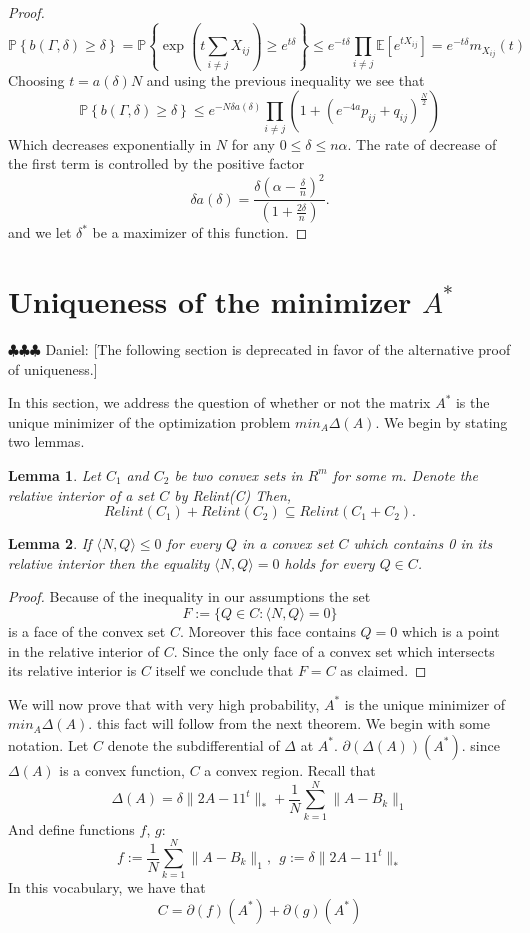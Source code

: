 \documentclass[12pt]{amsart}
\newtheorem{lemma}{Lemma}[section]
\theoremstyle{remark}
\newcommand{\PP}{\mathbb{P}}
\newcommand{\EE}{\mathbb{E}}
\newcommand{\ddr}[1]{{\color{blue} \sf $\clubsuit\clubsuit\clubsuit$ Daniel: [#1]}}
\begin{document}
\begin{proof}
\[\PP\left\{b(\Gamma,\delta)\geq \delta\right\}=\PP\left\{\exp\left(t\sum_{i\neq j} X_{ij}\right)\geq e^{t\delta}\right\}\leq e^{-t\delta}\prod_{i\neq j} \EE[e^{tX_{ij}}]= e^{-t\delta}m_{X_{ij}}(t)\]
Choosing $t=a(\delta)N$ and using the previous inequality we see that
\[\PP\left\{b(\Gamma,\delta)\geq \delta\right\}\leq e^{-N\delta a(\delta)}\prod_{i\neq j}\left(1+ (e^{-4a}p_{ij}+q_{ij})^{\frac{N}{2}}\right)\]
Which decreases exponentially in $N$ for any $0\leq \delta\leq n\alpha$. The rate of decrease of the first term is controlled by the positive factor 
\[\delta a(\delta)= \frac{\delta\left(\alpha-\frac{\delta}{n}\right)^2}{\left(1+\frac{2\delta}{n}\right)}.\]
and we let $\delta^*$ be a maximizer of this function.
\end{proof}


\section{Uniqueness of the minimizer $A^*$}
\ddr{The following section is deprecated in favor of the alternative proof of uniqueness.}

In this section, we address the question of whether or not the matrix $A^*$ is the unique minimizer of the optimization problem $min_A\Delta(A)$. We begin by stating two lemmas.

\begin{lemma}
Let $C_1$ and $C_2$ be two convex sets in $R^m$ for some m. Denote the relative interior of a set $C$ by Relint(C) Then,
\[
Relint(C_1)+Relint(C_2) \subseteq Relint(C_1+C_2).
\]
\end{lemma}


\begin{lemma}{\label{lema2}} If $\langle N,Q\rangle\leq 0$ for every $Q$ in a convex set $C$ which contains 0 in its relative interior then the equality  $\langle N,Q\rangle=0$ holds for every $Q\in C$.
\end{lemma}
\begin{proof} Because of the inequality in our assumptions the set
\[F:=\{ Q\in C: \langle N,Q\rangle=0\}\]
is a face of the convex set $C$. 
Moreover this face contains $Q=0$ which is a point in the relative interior of $C$. Since the only face of a convex set which intersects its relative interior is $C$ itself we conclude that $F=C$ as claimed.
\end{proof}
We will now prove that with very high probability, $A^*$ is the unique minimizer of $min_A\Delta(A)$. this fact will follow from the next theorem. We begin with some notation.
Let $C$ denote the subdifferential of $\Delta$ at $A^*$. $\partial(\Delta(A))(A^*)$. since $\Delta(A)$ is a convex function, $C$ a convex region.
Recall that 
\[\Delta(A)= \delta\|2A-11^t\|_{*}+\frac{1}{N}\sum_{k=1}^N\|A-B_k\|_1\] 
And define functions $f$, $g$:
\[
f:= \frac{1}{N}\sum_{k=1}^N\|A-B_k\|_1, \ \ g:= \delta\|2A-11^t\|_{*}
\]
In this vocabulary, we have that
\begin{equation}\label{SumaSubDif}
C = \partial(f)(A^*)+\partial(g)(A^*)
\end{equation}
\end{document}
